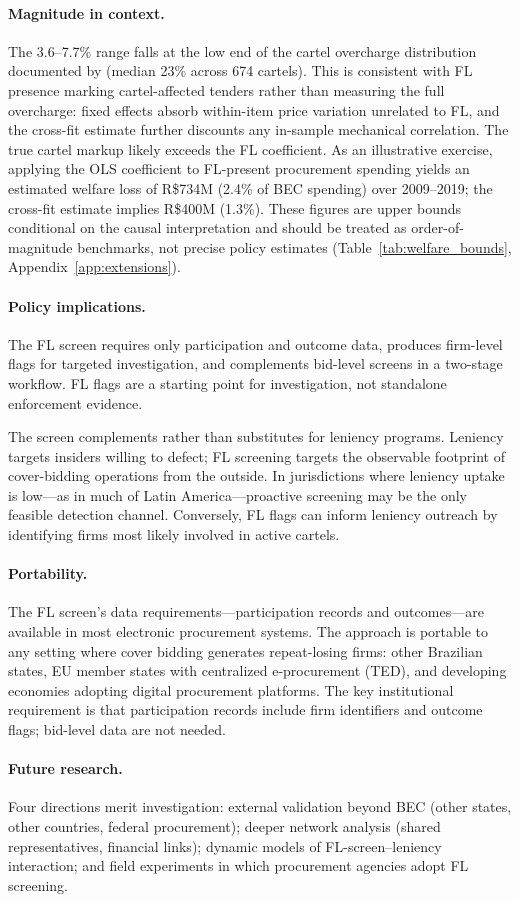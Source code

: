 \paragraph{Magnitude in context.}
The 3.6--7.7\% range falls at the low end of the cartel overcharge
distribution documented by \citet{connor2007price} (median 23\%
across 674 cartels). This is consistent with FL presence marking
cartel-affected tenders rather than measuring the full overcharge:
fixed effects absorb within-item price variation unrelated to FL, and
the cross-fit estimate further discounts any in-sample mechanical
correlation. The true cartel markup likely exceeds the FL coefficient.
As an illustrative exercise, applying the OLS coefficient to FL-present
procurement spending yields an estimated welfare loss of R\$734M
(2.4\% of BEC spending) over 2009--2019; the cross-fit estimate
implies R\$400M (1.3\%). These figures are upper bounds conditional
on the causal interpretation and should be treated as order-of-magnitude
benchmarks, not precise policy estimates
(Table~\ref{tab:welfare_bounds}, Appendix~\ref{app:extensions}).

\paragraph{Policy implications.}
The FL screen requires only participation and outcome data, produces
firm-level flags for targeted investigation, and complements bid-level
screens in a two-stage workflow. FL flags are a starting point for
investigation, not standalone enforcement evidence.

The screen complements rather than substitutes for leniency programs.
Leniency targets insiders willing to defect; FL screening targets
the observable footprint of cover-bidding operations from the outside.
In jurisdictions where leniency uptake is low---as in much of Latin
America---proactive screening may be the only feasible detection
channel. Conversely, FL flags can inform leniency outreach by
identifying firms most likely involved in active cartels.

\paragraph{Portability.}
The FL screen's data requirements---participation records and
outcomes---are available in most electronic procurement systems.
The approach is portable to any setting where cover bidding
generates repeat-losing firms: other Brazilian states, EU member
states with centralized e-procurement (TED), and developing economies
adopting digital procurement platforms. The key institutional
requirement is that participation records include firm identifiers
and outcome flags; bid-level data are not needed.

\paragraph{Future research.}
Four directions merit investigation: external validation beyond BEC
(other states, other countries, federal procurement);
deeper network analysis (shared representatives, financial links);
dynamic models of FL-screen--leniency interaction; and field
experiments in which procurement agencies adopt FL screening.
